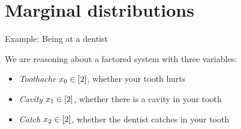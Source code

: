 \documentclass{beamer}
\begin{document}
    \section{Marginal distributions}



    \begin{frame}{Example: Being at a dentist}

        We are reasoning about a factored system with three variables:
        \begin{itemize}
            \item \emph{Toothache} $x_{0}\in[2]$, whether your tooth hurts
            \item \emph{Cavity} $x_{1}\in[2]$, whether there is a cavity in your tooth
            \item \emph{Catch} $x_{2}\in[2]$, whether the dentist catches in your tooth
        \end{itemize}


    \end{frame}
\end{document}

